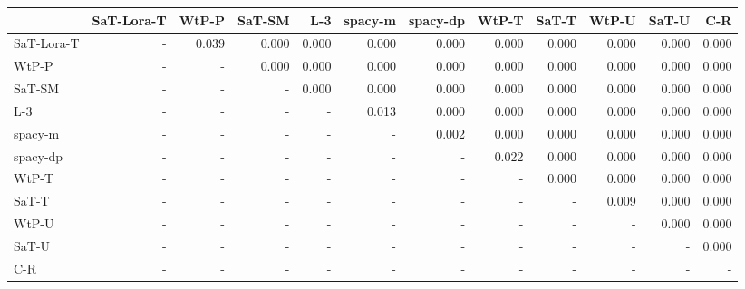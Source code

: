 \begin{tabular}{lrrrrrrrrrrr}
\toprule
 & SaT-Lora-T & WtP-P & SaT-SM & L-3 & spacy-m & spacy-dp & WtP-T & SaT-T & WtP-U & SaT-U & C-R \\
\midrule
SaT-Lora-T & - & 0.039 & 0.000 & 0.000 & 0.000 & 0.000 & 0.000 & 0.000 & 0.000 & 0.000 & 0.000 \\
WtP-P & - & - & 0.000 & 0.000 & 0.000 & 0.000 & 0.000 & 0.000 & 0.000 & 0.000 & 0.000 \\
SaT-SM & - & - & - & 0.000 & 0.000 & 0.000 & 0.000 & 0.000 & 0.000 & 0.000 & 0.000 \\
L-3 & - & - & - & - & 0.013 & 0.000 & 0.000 & 0.000 & 0.000 & 0.000 & 0.000 \\
spacy-m & - & - & - & - & - & 0.002 & 0.000 & 0.000 & 0.000 & 0.000 & 0.000 \\
spacy-dp & - & - & - & - & - & - & 0.022 & 0.000 & 0.000 & 0.000 & 0.000 \\
WtP-T & - & - & - & - & - & - & - & 0.000 & 0.000 & 0.000 & 0.000 \\
SaT-T & - & - & - & - & - & - & - & - & 0.009 & 0.000 & 0.000 \\
WtP-U & - & - & - & - & - & - & - & - & - & 0.000 & 0.000 \\
SaT-U & - & - & - & - & - & - & - & - & - & - & 0.000 \\
C-R & - & - & - & - & - & - & - & - & - & - & - \\
\bottomrule
\end{tabular}

